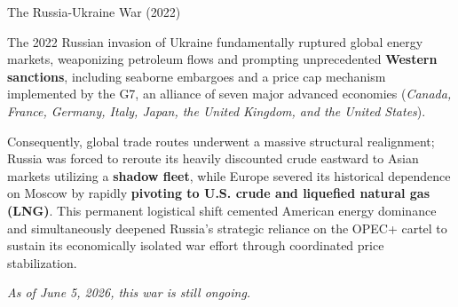 \documentclass[10pt]{article}
\begin{document}
      \begin{core}[label=core:ukraine]{The Russia-Ukraine War (2022)}

        The 2022 Russian invasion of Ukraine fundamentally ruptured global energy markets, weaponizing petroleum flows and prompting unprecedented \textbf{Western sanctions}, including seaborne embargoes and a price cap mechanism implemented by the G7, an alliance of seven major advanced economies (\textit{Canada, France, Germany, Italy, Japan, the United Kingdom, and the United States}).

        Consequently, global trade routes underwent a massive structural realignment; Russia was forced to reroute its heavily discounted crude eastward to Asian markets utilizing a \textbf{shadow fleet}, while Europe severed its historical dependence on Moscow by rapidly \textbf{pivoting to U.S. crude and liquefied natural gas (LNG)}. This permanent logistical shift cemented American energy dominance and simultaneously deepened Russia's strategic reliance on the OPEC+ cartel to sustain its economically isolated war effort through coordinated price stabilization.

        \textit{As of June 5, 2026, this war is still ongoing.}


      \end{core}
\end{document}
